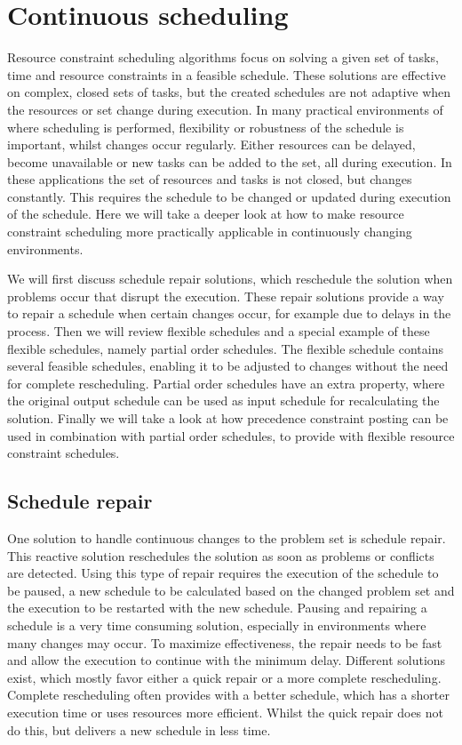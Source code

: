 \documentclass{article}
\begin{document}
\section{Continuous scheduling}
\label{section:continuous}
Resource constraint scheduling algorithms focus on solving a given set of tasks, time and resource constraints in a feasible schedule.
These solutions are effective on complex, closed sets of tasks, but the created schedules are not adaptive when the resources or set change during execution.
In many practical environments of where scheduling is performed, flexibility or robustness of the schedule is important, whilst changes occur regularly.
Either resources can be delayed, become unavailable or new tasks can be added to the set, all during execution.
In these applications the set of resources and tasks is not closed, but changes constantly.
This requires the schedule to be changed or updated during execution of the schedule.
Here we will take a deeper look at how to make resource constraint scheduling more practically applicable in continuously changing environments.

We will first discuss schedule repair solutions, which reschedule the solution when problems occur that disrupt the execution.
These repair solutions provide a way to repair a schedule when certain changes occur, for example due to delays in the process.
Then we will review flexible schedules and a special example of these flexible schedules, namely partial order schedules.
The flexible schedule contains several feasible schedules, enabling it to be adjusted to changes without the need for complete rescheduling.
Partial order schedules have an extra property, where the original output schedule can be used as input schedule for recalculating the solution.
Finally we will take a look at how precedence constraint posting can be used in combination with partial order schedules, to provide with flexible resource constraint schedules.

\subsection{Schedule repair}
One solution to handle continuous changes to the problem set is schedule repair.
This reactive solution reschedules the solution as soon as problems or conflicts are detected.
Using this type of repair requires the execution of the schedule to be paused, a new schedule to be calculated based on the changed problem set and the execution to be restarted with the new schedule.
Pausing and repairing a schedule is a very time consuming solution, especially in environments where many changes may occur.
To maximize effectiveness, the repair needs to be fast and allow the execution to continue with the minimum delay.
Different solutions exist, which mostly favor either a quick repair or a more complete rescheduling.
\cite{policella07}
Complete rescheduling often provides with a better schedule, which has a shorter execution time or uses resources more efficient.
Whilst the quick repair does not do this, but delivers a new schedule in less time.
\end{document}
